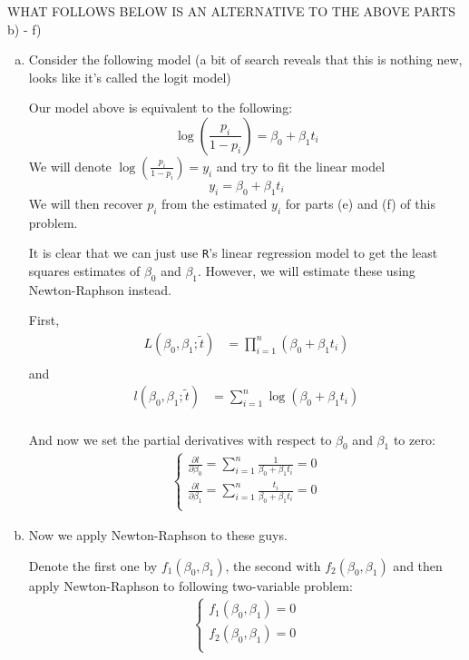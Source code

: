 \documentclass[12pt]{article}
\begin{document}
\bigskip
\bigskip
\bigskip
\bigskip
\bigskip
\bigskip
\bigskip
\bigskip
\bigskip
\bigskip
\bigskip
\bigskip
\bigskip
\bigskip
\bigskip
\bigskip

WHAT FOLLOWS BELOW IS AN ALTERNATIVE TO THE ABOVE PARTS b) - f)
\bigskip
\bigskip
\bigskip
\bigskip
\bigskip
\bigskip

 \begin{enumerate}[(b)]
\item Consider the following model (a bit of search reveals that this is nothing new, looks like it's called the logit model)

Our model above is equivalent to the following:
$$
\log\left(\frac{p_i}{1 - p_i}\right) = \beta_0 + \beta_1 t_i
$$
We will denote $\log\left(\frac{p_i}{1 - p_i}\right) = y_i$ and try to fit the linear model
$$
y_i = \beta_0 + \beta_1 t_i
$$
We will then recover $p_i$ from the estimated $y_i$ for parts (e) and (f) of this problem.

It is clear that we can just use \texttt{R}'s linear regression model to get the least squares estimates of $\beta_0$ and $\beta_1$. However, we will estimate these using Newton-Raphson instead.

First,
\begin{align*}
L(\beta_0, \beta_1 ; \tilde t) &= \prod_{i=1}^n ( \beta_0 + \beta_1 t_i )\\
\end{align*}
and
\begin{align*}
l(\beta_0, \beta_1 ; \tilde t) &= \sum_{i=1}^n \log( \beta_0 + \beta_1 t_i )\\
\end{align*}

And now we set the partial derivatives with respect to $\beta_0$ and $\beta_1$ to zero:
\begin{align*}
    \begin{cases} 
         \frac {\partial l} {\partial \beta_0} = \sum_{i=1}^n \frac{1} {\beta_0 + \beta_1 t_i} = 0\\
         \frac {\partial l} {\partial \beta_1} = \sum_{i=1}^n \frac{t_i} {\beta_0 + \beta_1 t_i} = 0\\
    \end{cases}
\end{align*}


\item Now we apply Newton-Raphson to these guys.

Denote the first one by $f_1(\beta_0, \beta_1)$, the second with $f_2(\beta_0, \beta_1)$ and then apply Newton-Raphson to following two-variable problem:
\begin{align*}
    \begin{cases} 
         f_1(\beta_0, \beta_1) = 0\\
         f_2(\beta_0, \beta_1) =  0\\
    \end{cases}
\end{align*}


\end{enumerate}
\end{document}
